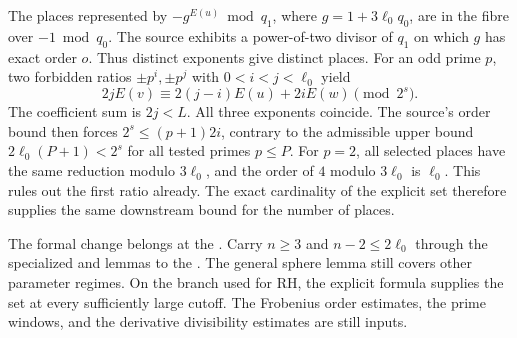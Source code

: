 The places represented by $-g^{E(u)}\bmod q_1$, where $g=1+3\ell_0q_0$,
are in the fibre over $-1\bmod q_0$. The source exhibits a power-of-two
divisor of $q_1$ on which $g$ has exact order $o$. Thus distinct exponents give
distinct places. For an odd prime $p$, two forbidden ratios
$\pm p^i,\pm p^j$ with $0<i<j<\ell_0$ yield
\[
  2j E(v)\equiv 2(j-i)E(u)+2iE(w)\pmod{2^s}.
\]
The coefficient sum is $2j<L$. All three exponents coincide. The source's
order bound then forces $2^s\le(p+1)2i$, contrary to the admissible upper
bound $2\ell_0(P+1)<2^s$ for all tested primes $p\le P$.
For $p=2$, all selected places have the same reduction modulo $3\ell_0$,
and the order of $4$ modulo $3\ell_0$ is $\ell_0$. This rules out the first
ratio already. The exact cardinality of the explicit set therefore supplies
the same downstream bound for the number of places.

The formal change belongs at the . Carry $n\ge3$ and $n-2\le2\ell_0$ through the specialized  and  lemmas to the . The general sphere lemma still covers other parameter regimes. On the branch used for RH, the explicit formula supplies the set at every sufficiently large cutoff. The Frobenius order estimates, the prime windows, and the derivative divisibility estimates are still inputs.
